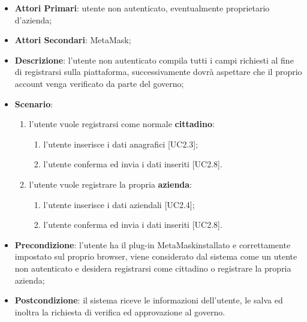 \begin{itemize}
	\item \textbf{Attori Primari}: utente non autenticato, eventualmente proprietario d'azienda;
	\item \textbf{Attori Secondari}: MetaMask\glo;
	\item \textbf{Descrizione}: l'utente non autenticato compila tutti i campi richiesti al fine di registrarsi sulla piattaforma, successivamente dovrà aspettare che il proprio account venga verificato da parte del governo\glo;
	\item \textbf{Scenario}: 
	
	\begin{enumerate}[label=\alph*.]
		
		\item l'utente vuole registrarsi come normale \textbf{cittadino}: 
		\begin{enumerate}[label=\roman*.]
			\item l'utente inserisce i dati anagrafici [UC2.3];
			\item l'utente conferma ed invia i dati inseriti [UC2.8].
		\end{enumerate}
	
	
		\item l'utente vuole registrare la propria \textbf{azienda}:
		\begin{enumerate}[label=\roman*.]
			\item l'utente inserisce i dati aziendali [UC2.4];
			\item l'utente conferma ed invia i dati inseriti [UC2.8].
		\end{enumerate}
		

	 
	\end{enumerate}
	\item \textbf{Precondizione}: l'utente ha il plug-in MetaMask\glosp installato e correttamente impostato sul proprio browser, viene considerato dal sistema come un utente non autenticato e desidera registrarsi come cittadino o registrare la propria azienda; 
	\item \textbf{Postcondizione}: il sistema riceve le informazioni dell'utente, le salva ed inoltra la richiesta di verifica ed approvazione al governo\glo.
	
\end{itemize}
